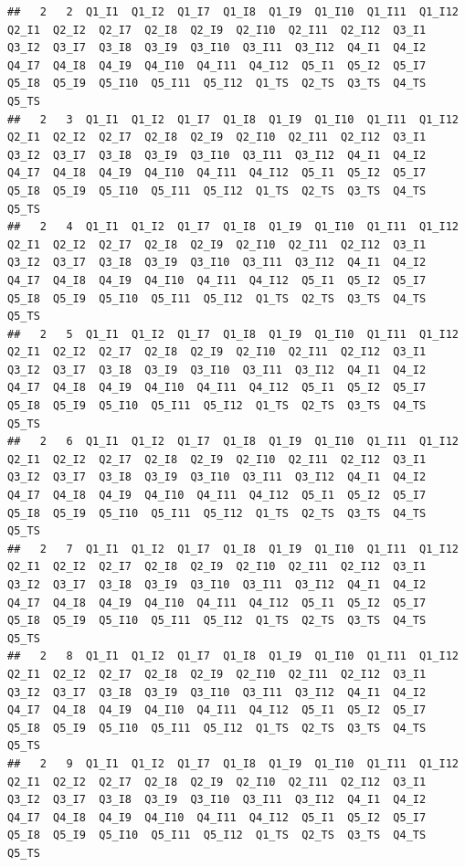 \documentclass[]{book}
\begin{document}
\begin{verbatim}
##   2   2  Q1_I1  Q1_I2  Q1_I7  Q1_I8  Q1_I9  Q1_I10  Q1_I11  Q1_I12  Q2_I1  Q2_I2  Q2_I7  Q2_I8  Q2_I9  Q2_I10  Q2_I11  Q2_I12  Q3_I1  Q3_I2  Q3_I7  Q3_I8  Q3_I9  Q3_I10  Q3_I11  Q3_I12  Q4_I1  Q4_I2  Q4_I7  Q4_I8  Q4_I9  Q4_I10  Q4_I11  Q4_I12  Q5_I1  Q5_I2  Q5_I7  Q5_I8  Q5_I9  Q5_I10  Q5_I11  Q5_I12  Q1_TS  Q2_TS  Q3_TS  Q4_TS  Q5_TS
##   2   3  Q1_I1  Q1_I2  Q1_I7  Q1_I8  Q1_I9  Q1_I10  Q1_I11  Q1_I12  Q2_I1  Q2_I2  Q2_I7  Q2_I8  Q2_I9  Q2_I10  Q2_I11  Q2_I12  Q3_I1  Q3_I2  Q3_I7  Q3_I8  Q3_I9  Q3_I10  Q3_I11  Q3_I12  Q4_I1  Q4_I2  Q4_I7  Q4_I8  Q4_I9  Q4_I10  Q4_I11  Q4_I12  Q5_I1  Q5_I2  Q5_I7  Q5_I8  Q5_I9  Q5_I10  Q5_I11  Q5_I12  Q1_TS  Q2_TS  Q3_TS  Q4_TS  Q5_TS
##   2   4  Q1_I1  Q1_I2  Q1_I7  Q1_I8  Q1_I9  Q1_I10  Q1_I11  Q1_I12  Q2_I1  Q2_I2  Q2_I7  Q2_I8  Q2_I9  Q2_I10  Q2_I11  Q2_I12  Q3_I1  Q3_I2  Q3_I7  Q3_I8  Q3_I9  Q3_I10  Q3_I11  Q3_I12  Q4_I1  Q4_I2  Q4_I7  Q4_I8  Q4_I9  Q4_I10  Q4_I11  Q4_I12  Q5_I1  Q5_I2  Q5_I7  Q5_I8  Q5_I9  Q5_I10  Q5_I11  Q5_I12  Q1_TS  Q2_TS  Q3_TS  Q4_TS  Q5_TS
##   2   5  Q1_I1  Q1_I2  Q1_I7  Q1_I8  Q1_I9  Q1_I10  Q1_I11  Q1_I12  Q2_I1  Q2_I2  Q2_I7  Q2_I8  Q2_I9  Q2_I10  Q2_I11  Q2_I12  Q3_I1  Q3_I2  Q3_I7  Q3_I8  Q3_I9  Q3_I10  Q3_I11  Q3_I12  Q4_I1  Q4_I2  Q4_I7  Q4_I8  Q4_I9  Q4_I10  Q4_I11  Q4_I12  Q5_I1  Q5_I2  Q5_I7  Q5_I8  Q5_I9  Q5_I10  Q5_I11  Q5_I12  Q1_TS  Q2_TS  Q3_TS  Q4_TS  Q5_TS
##   2   6  Q1_I1  Q1_I2  Q1_I7  Q1_I8  Q1_I9  Q1_I10  Q1_I11  Q1_I12  Q2_I1  Q2_I2  Q2_I7  Q2_I8  Q2_I9  Q2_I10  Q2_I11  Q2_I12  Q3_I1  Q3_I2  Q3_I7  Q3_I8  Q3_I9  Q3_I10  Q3_I11  Q3_I12  Q4_I1  Q4_I2  Q4_I7  Q4_I8  Q4_I9  Q4_I10  Q4_I11  Q4_I12  Q5_I1  Q5_I2  Q5_I7  Q5_I8  Q5_I9  Q5_I10  Q5_I11  Q5_I12  Q1_TS  Q2_TS  Q3_TS  Q4_TS  Q5_TS
##   2   7  Q1_I1  Q1_I2  Q1_I7  Q1_I8  Q1_I9  Q1_I10  Q1_I11  Q1_I12  Q2_I1  Q2_I2  Q2_I7  Q2_I8  Q2_I9  Q2_I10  Q2_I11  Q2_I12  Q3_I1  Q3_I2  Q3_I7  Q3_I8  Q3_I9  Q3_I10  Q3_I11  Q3_I12  Q4_I1  Q4_I2  Q4_I7  Q4_I8  Q4_I9  Q4_I10  Q4_I11  Q4_I12  Q5_I1  Q5_I2  Q5_I7  Q5_I8  Q5_I9  Q5_I10  Q5_I11  Q5_I12  Q1_TS  Q2_TS  Q3_TS  Q4_TS  Q5_TS
##   2   8  Q1_I1  Q1_I2  Q1_I7  Q1_I8  Q1_I9  Q1_I10  Q1_I11  Q1_I12  Q2_I1  Q2_I2  Q2_I7  Q2_I8  Q2_I9  Q2_I10  Q2_I11  Q2_I12  Q3_I1  Q3_I2  Q3_I7  Q3_I8  Q3_I9  Q3_I10  Q3_I11  Q3_I12  Q4_I1  Q4_I2  Q4_I7  Q4_I8  Q4_I9  Q4_I10  Q4_I11  Q4_I12  Q5_I1  Q5_I2  Q5_I7  Q5_I8  Q5_I9  Q5_I10  Q5_I11  Q5_I12  Q1_TS  Q2_TS  Q3_TS  Q4_TS  Q5_TS
##   2   9  Q1_I1  Q1_I2  Q1_I7  Q1_I8  Q1_I9  Q1_I10  Q1_I11  Q1_I12  Q2_I1  Q2_I2  Q2_I7  Q2_I8  Q2_I9  Q2_I10  Q2_I11  Q2_I12  Q3_I1  Q3_I2  Q3_I7  Q3_I8  Q3_I9  Q3_I10  Q3_I11  Q3_I12  Q4_I1  Q4_I2  Q4_I7  Q4_I8  Q4_I9  Q4_I10  Q4_I11  Q4_I12  Q5_I1  Q5_I2  Q5_I7  Q5_I8  Q5_I9  Q5_I10  Q5_I11  Q5_I12  Q1_TS  Q2_TS  Q3_TS  Q4_TS  Q5_TS

\end{verbatim}
\end{document}

